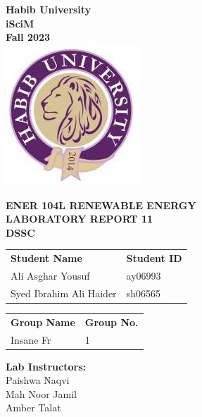 \documentclass[a4paper, 12pt, english]{article}
\begin{document}
\begin{titlepage}
	\begin{center}
		\textbf{\LARGE Habib University}\\[0.5cm]
		\textbf{\large iSciM}\\[0.2cm]
		\textbf {\large Fall 2023}\\[0.2cm]
		\vspace{20pt}
		\includegraphics[width=5cm]{../habiblogo.jpg}\\[1cm]
		\par
		\vspace{20pt}
		\textbf{\Large ENER 104L RENEWABLE ENERGY}\\
		\vspace{15pt}
		\myrule[1pt][7pt]
		\textbf{\LARGE  LABORATORY REPORT 11}\\
		\vspace{15pt}
		\textbf{\large DSSC}\\
		\myrule[1pt][7pt]
		\vspace{25pt}
		\begin{tabular}{@{}p{5cm}p{3cm}@{}}
			\textbf{\large Student Name} & \textbf{\large Student ID} \\
			Ali Asghar Yousuf            & ay06993                    \\ %
			Syed Ibrahim Ali Haider      & sh06565                    \\ %
		\end{tabular}

		\vspace{10pt}
		\begin{tabular}{@{}p{5cm}p{3cm}@{}}
			\textbf{\large Group Name} & \textbf{\large Group No.} \\
			Insane Fr                  & 1                         \\
		\end{tabular}

		\vspace{45pt}
		\textbf {\large Lab Instructors:}\\[0.2cm]
		\Large {Paishwa Naqvi}\\[0.1cm]
		\Large {Mah Noor Jamil}\\[0.1cm]
		\Large {Amber Talat}\\[0.1cm]
	\end{center}


\end{titlepage}
\end{document}
